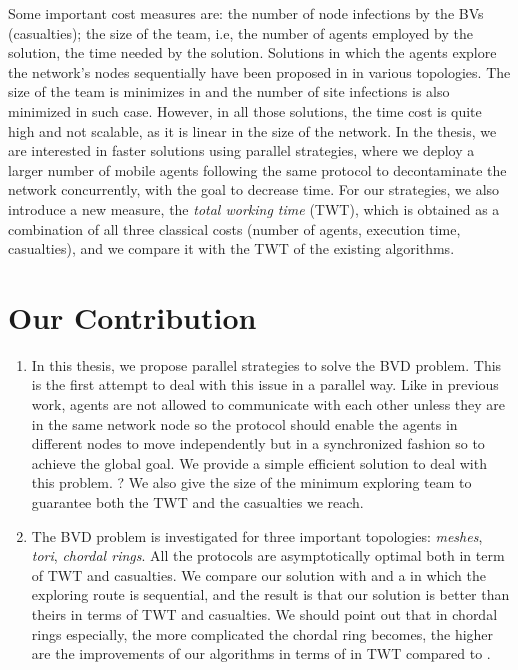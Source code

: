 Some important cost measures are: 
 the number of node infections by the BVs (casualties); 
the size of the team, i.e, the number of agents employed by the solution, 
the time needed by the solution. 
Solutions in which the agents explore the network's nodes sequentially have been proposed in \cite{alotaibi,cai,cai1} in various topologies. The size of the team is minimizes in \cite{cai,cai1} and the number of site infections is also minimized in such case. However, in all those solutions, the time cost is quite high and not scalable, as it is linear in the size of the network.  In the thesis, we are interested in faster solutions using parallel strategies, where we deploy a larger number of mobile agents following the same protocol to decontaminate the network concurrently,  with the goal to  decrease time. For our strategies, we also introduce a new measure,   the {\em total working time} (TWT),  which is obtained as a combination of all three classical costs (number of agents,    execution time, casualties), and we compare it with the TWT of the existing algorithms.


\section{Our Contribution} 


\begin{enumerate}
\item In this thesis, we propose parallel strategies to solve the BVD problem. This is the first attempt to deal with this issue in a parallel way. Like in previous work, agents are not allowed to communicate with each other unless they are in the same network node so the protocol should enable the agents in different nodes to move independently but in  a synchronized fashion so to achieve the global goal.
We provide a simple   efficient solution to deal with this problem. 
\color{blue} ? We also give the size of the minimum exploring team  to guarantee both the TWT and the  casualties we reach.  \color{black}
\item The BVD problem is investigated for three important topologies: {\em meshes}, {\em tori}, {\em chordal rings}. All the protocols are asymptotically optimal both in term of TWT and casualties. We compare our solution with \cite{alotaibi} and  \cite{cai} a in which the exploring route is  sequential, and the result is that our solution is better than theirs in terms of TWT and casualties. We  should   point out that in chordal rings especially, the more complicated the chordal ring becomes, the higher are the improvements of our algorithms in terms of in TWT  compared to \cite{alotaibi}.
\end{enumerate}

